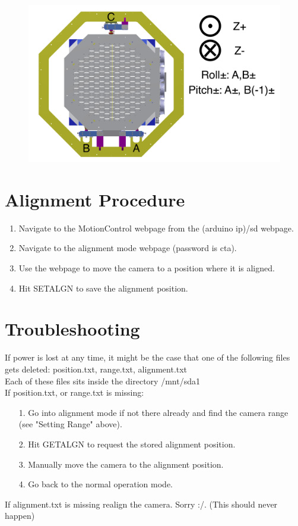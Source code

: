 \documentclass[11pt]{article}
\begin{document}
\begin{figure}[h]
\begin{center}
\includegraphics[width = 4.5in]{camerapic.png}
\caption{}  
\label{fd2}
\end{center}
\end{figure}


\section{Alignment Procedure}
\label{alignSec}
\begin{enumerate}
	\item Navigate to the MotionControl webpage from the (arduino ip)/sd webpage.
	\item Navigate to the alignment mode webpage (password is cta).
	\item Use the webpage to move the camera to a position where it is aligned.
	\item Hit SETALGN to save the alignment position.
\end{enumerate}

\section{Troubleshooting}
If power is lost at any time, it might be the case that one of the following files gets deleted: position.txt, range.txt, alignment.txt\\[15pt]
Each of these files sits inside the directory /mnt/sda1\\[15pt]
If position.txt, or range.txt is missing:
\begin{enumerate}
\item[1.] Go into alignment mode if not there already and find the camera range (see "Setting Range" above).
\item[2.] Hit GETALGN to request the stored alignment position.
\item[3.] Manually move the camera to the alignment position.
\item[4.] Go back to the normal operation mode.
\end{enumerate}
If alignment.txt is missing realign the camera. Sorry :/. (This should never happen)
\end{document}
